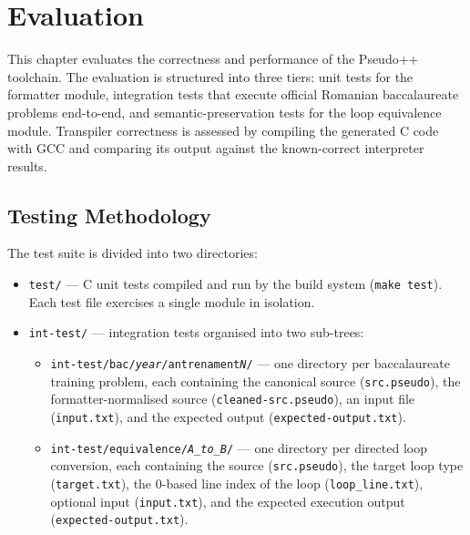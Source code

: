 \chapter{Evaluation}
\label{chap:evaluation}

This chapter evaluates the correctness and performance of the Pseudo++
toolchain.  The evaluation is structured into three tiers: unit tests for
the formatter module, integration tests that execute official Romanian
baccalaureate problems end-to-end, and semantic-preservation tests for the
loop equivalence module.  Transpiler correctness is assessed by compiling the
generated C code with GCC and comparing its output against the known-correct
interpreter results.

\section{Testing Methodology}
\label{sec:methodology}

The test suite is divided into two directories:

\begin{itemize}
  \item \texttt{test/} --- C unit tests compiled and run by the build system
        (\texttt{make test}).  Each test file exercises a single module in
        isolation.

  \item \texttt{int-test/} --- integration tests organised into two
        sub-trees:
        \begin{itemize}
          \item \texttt{int-test/bac/\textit{year}/antrenament\textit{N}/}
                --- one directory per baccalaureate training problem, each
                containing the canonical source (\texttt{src.pseudo}), the
                formatter-normalised source (\texttt{cleaned-src.pseudo}),
                an input file (\texttt{input.txt}), and the
                expected output (\texttt{expected-output.txt}).
          \item \texttt{int-test/equivalence/\textit{A\_to\_B}/} --- one
                directory per directed loop conversion, each containing the
                source (\texttt{src.pseudo}), the target loop type
                (\texttt{target.txt}), the 0-based line index of the loop
                (\texttt{loop\_line.txt}), optional input (\texttt{input.txt}),
                and the expected execution output (\texttt{expected-output.txt}).
        \end{itemize}
\end{itemize}

